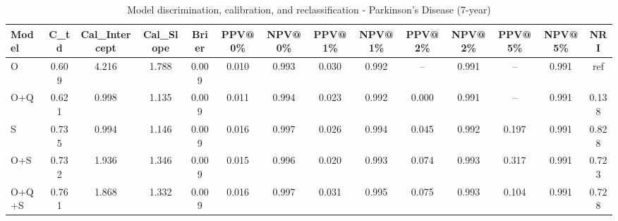 \begin{table}[htbp]
\centering
\small
\caption{Model discrimination, calibration, and reclassification - Parkinson's Disease (7-year)}
\label{tab:perf_pd_7y}
\begin{tabular}{lccccccccccccc}
\toprule
Model & C\_td & Cal\_Intercept & Cal\_Slope & Brier & PPV@0\% & NPV@0\% & PPV@1\% & NPV@1\% & PPV@2\% & NPV@2\% & PPV@5\% & NPV@5\% & NRI \\
\midrule
O & 0.609 & 4.216 & 1.788 & 0.009 & 0.010 & 0.993 & 0.030 & 0.992 & -- & 0.991 & -- & 0.991 & ref \\
O+Q & 0.621 & 0.998 & 1.135 & 0.009 & 0.011 & 0.994 & 0.023 & 0.992 & 0.000 & 0.991 & -- & 0.991 & 0.138 \\
S & 0.735 & 0.994 & 1.146 & 0.009 & 0.016 & 0.997 & 0.026 & 0.994 & 0.045 & 0.992 & 0.197 & 0.991 & 0.828 \\
O+S & 0.732 & 1.936 & 1.346 & 0.009 & 0.015 & 0.996 & 0.020 & 0.993 & 0.074 & 0.993 & 0.317 & 0.991 & 0.723 \\
O+Q+S & 0.761 & 1.868 & 1.332 & 0.009 & 0.016 & 0.997 & 0.031 & 0.995 & 0.075 & 0.993 & 0.104 & 0.991 & 0.728 \\
\bottomrule
\end{tabular}
\end{table}